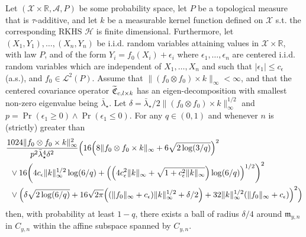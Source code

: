 \documentclass[AHL,Unicode,longabstracts,published]{cedram}
\theoremstyle{remark}
\newcommand{\R}{\mathbb{R}}
\newcommand{\X}{\mathcal{X}}
\newcommand{\clA}{\mathcal{A}}
\newcommand{\cH}{\mathcal{H}}
\newcommand{\clL}{\mathcal{L}}
\newcommand{\fkC}{\mathfrak{C}}
\newcommand{\mean}{\mathfrak{m}}
\let\oldtilde\tilde
\renewcommand*{\tilde}[1]{\mathchoice{\widetilde{#1}}{\widetilde{#1}}{\oldtilde{#1}}{\oldtilde{#1}}}
\let\originalleft\left
\let\originalright\right
\renewcommand{\left}{\mathopen{}\mathclose\bgroup\originalleft}
\renewcommand{\right}{\aftergroup\egroup\originalright}
\begin{document}
\begin{prop}\label{prop:bnd_Y}
Let $(\X \times \R,\clA,P)$ be some probability space, let $P$ be a topological measure that is $\tau$-additive, and let $k$ be a measurable kernel function defined on $\X$ s.t. the corresponding RKHS $\cH$ is finite dimensional. Furthermore, let $(X_1,Y_1),\dots, (X_n,Y_n)$ be i.i.d. random variables attaining values in $\X \times \R$, with law $P$, and of the form $Y_i = f_0(X_i) + \epsilon_i$ where $\epsilon_1,\dots, \epsilon_n$ are centered i.i.d. random variables which are independent of $X_1,\dots, X_n$ and such that $|\epsilon_1| \leq c_\epsilon$ (a.s.), and $f_0 \in \clL^2(P)$. Assume that $\|(f_0 \otimes f_0) \times k\|_\infty < \infty$, and that the centered covariance operator $\tilde{\fkC}_{c,l \times k}$ has an eigen-decomposition with smallest non-zero eigenvalue being $\bar \lambda_\star$. Let $\delta = \bar \lambda_\star/2 \|(f_0 \otimes f_0) \times k\|_\infty^{1/2}$ and $p = \Pr(\epsilon_1 \geq 0) \wedge \Pr(\epsilon_1 \leq 0)$. For any $q \in (0,1)$ and whenever $n$ is (strictly) greater than
\begin{align*}
&\frac{1024 \|f_0 \otimes f_0 \times k\|^2_\infty}{p^2 \bar \lambda_\star^4 \delta^2}
\Bigl(16 \left(8 \|f_0 \otimes f_0 \times k\|_\infty + 6\sqrt{2\log(3/q)}\right)^2 \\
&\enspace \vee 16 \left(4 c_\epsilon \|k\|^{1/2}_\infty \log(6/q) + \left(\left(4c^2_\epsilon \|k\|_\infty + \sqrt{1+c^2_\epsilon \|k\|_\infty}\right)\log(6/q)\right)^{1/2}\right)^2 \\
&\enspace \vee \left(\delta \sqrt{2\log(6/q)} + 16 \sqrt{2\pi} \left((\|f_0\|_\infty + c_\epsilon) \|k\|_\infty^{1/2} +\delta/2\right) + 32 \|k\|_\infty^{1/2} (\|f_0\|_\infty + c_\epsilon)\right)^2
\Bigr)
\end{align*}
then, with probability at least $1-q$, there exists a ball of radius $\delta/4$ around $\mean_{y,n}$\linebreak in $C_{y,n}$ within the affine subspace spanned by $C_{y,n}$.
\end{prop}
\end{document}
